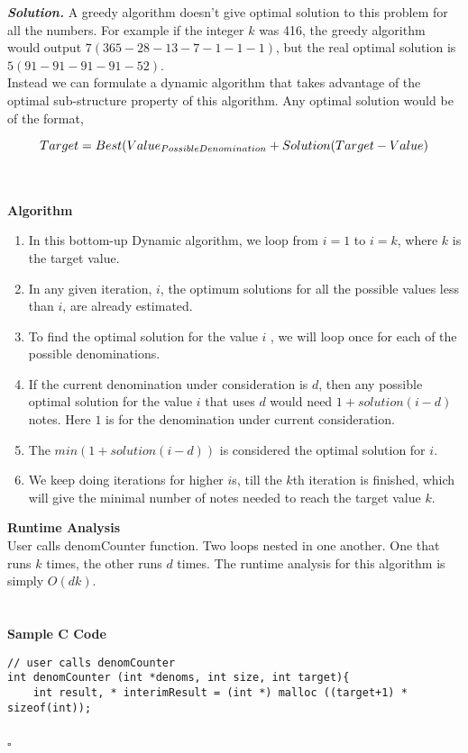 \documentclass[12pt]{article}
\newenvironment{solution}[1][\it{Solution}]{\textbf{#1. } }{$\square$}
\begin{document}
\begin{solution}
	A greedy algorithm doesn't give optimal solution to this problem for all the numbers. For example if the integer $k$ was 416, the greedy algorithm would output $7 (365 - 28 - 13 - 7 - 1 - 1 -1)$, but the real optimal solution is $5 (91 - 91 - 91 -91 - 52)$. 
 \\ \indent Instead we can formulate a dynamic algorithm that takes advantage of the optimal sub-structure property of this algorithm. Any optimal solution would be of the format, 
 
 \begin{equation*}
        Target = Best(Value_{Possible \space Denomination} + Solution(Target - Value)     
 \end{equation*}
  
 \\ \\\textbf{Algorithm} \\
\begin{enumerate}
    \item In this bottom-up Dynamic algorithm, we loop from $i = 1$ to $i= k$, where $k$ is the target value. 
    \item  In any given iteration, $i$, the optimum solutions for all the possible values less than $i$, are already estimated. 
    \item To find the optimal solution for the value $i$ , we will loop once for each of the possible denominations. 
    \item  If the current denomination under consideration is $d$, then any possible optimal solution for the value $i$ that uses $d$ would need $1+solution(i-d)$ notes. Here $1$ is for the denomination under current consideration.
    \item The $min(1+solution(i-d))$ is considered the optimal solution for $i$. 
    \item We keep doing iterations for higher $i$s, till the $k$th iteration is finished, which will give the minimal number of notes needed to reach the target value $k$.  \\
\end{enumerate}
\textbf{\indent Runtime Analysis} \\  
\indent User calls denomCounter function.  Two loops nested in one another. One that runs $k$ times, the other runs $d$ times.  The runtime analysis for this algorithm is simply $O(dk)$.\\ \\
\indent 
\\
\textbf{Sample C Code} 
\begin{verbatim}
// user calls denomCounter 
int denomCounter (int *denoms, int size, int target){
    int result, * interimResult = (int *) malloc ((target+1) * sizeof(int));
    

\end{verbatim}
\end{solution}
\end{document}
